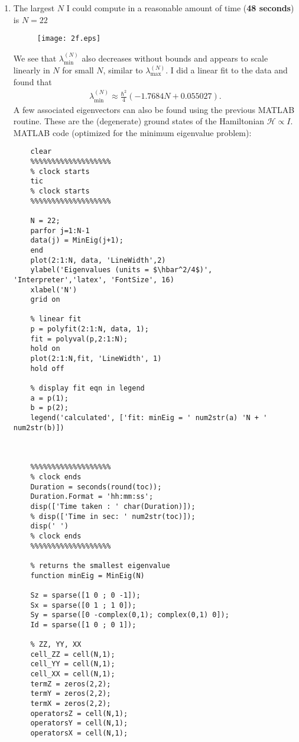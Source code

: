 \documentclass{article}
\theoremstyle{definition}
\newcommand{\ham}{\mathcal{H}}
\newcommand{\f}[2]{\frac{#1}{#2}}
\newcommand{\lp}{\left(}
\newcommand{\rp}{\right)}
\begin{document}
\begin{enumerate}[label=(\alph*)]
	\item The largest $N$ I could compute in a reasonable amount of time (\textbf{48 seconds}) is $\boxed{N=22}$
	\begin{figure}[!htb]
		\centering
		\texttt{[image: 2f.eps]}
	\end{figure}

 
	We see that $\lambda_{\text{min}}^{(N)}$ also decreases without bounds and appears to scale linearly in $N$ for small $N$, similar to $\lambda_\text{max}^{(N)}$. I did a linear fit to the data and found that 
	\begin{align*}
	\lambda_\text{min}^{(N)} \approx \f{\hbar^2}{4}\lp -1.7684N + 0.055027\rp .
	\end{align*} 
	A few associated eigenvectors can also be found using the previous MATLAB routine. These are the (degenerate) ground states of the Hamiltonian $\ham \propto I$.  \\
	
	
	
	
	
	MATLAB code (optimized for the minimum eigenvalue problem):
	\begin{lstlisting}
	clear 
	%%%%%%%%%%%%%%%%%%%
	% clock starts
	tic 
	% clock starts
	%%%%%%%%%%%%%%%%%%%
	
	N = 22;
	parfor j=1:N-1
	data(j) = MinEig(j+1);
	end
	plot(2:1:N, data, 'LineWidth',2)
	ylabel('Eigenvalues (units = $\hbar^2/4$)', 'Interpreter','latex', 'FontSize', 16)
	xlabel('N')
	grid on
	
	% linear fit
	p = polyfit(2:1:N, data, 1);
	fit = polyval(p,2:1:N);
	hold on
	plot(2:1:N,fit, 'LineWidth', 1)
	hold off
	
	% display fit eqn in legend
	a = p(1);
	b = p(2);
	legend('calculated', ['fit: minEig = ' num2str(a) 'N + ' num2str(b)])
	
	
	
	%%%%%%%%%%%%%%%%%%%
	% clock ends
	Duration = seconds(round(toc));
	Duration.Format = 'hh:mm:ss';
	disp(['Time taken : ' char(Duration)]);
	% disp(['Time in sec: ' num2str(toc)]);
	disp(' ')
	% clock ends
	%%%%%%%%%%%%%%%%%%%
	
	% returns the smallest eigenvalue
	function minEig = MinEig(N)
	
	Sz = sparse([1 0 ; 0 -1]);
	Sx = sparse([0 1 ; 1 0]);
	Sy = sparse([0 -complex(0,1); complex(0,1) 0]);
	Id = sparse([1 0 ; 0 1]);
	
	% ZZ, YY, XX
	cell_ZZ = cell(N,1);
	cell_YY = cell(N,1);
	cell_XX = cell(N,1);
	termZ = zeros(2,2);
	termY = zeros(2,2);
	termX = zeros(2,2);
	operatorsZ = cell(N,1);
	operatorsY = cell(N,1);
	operatorsX = cell(N,1);
	

\end{lstlisting}
\end{enumerate}
\end{document}
